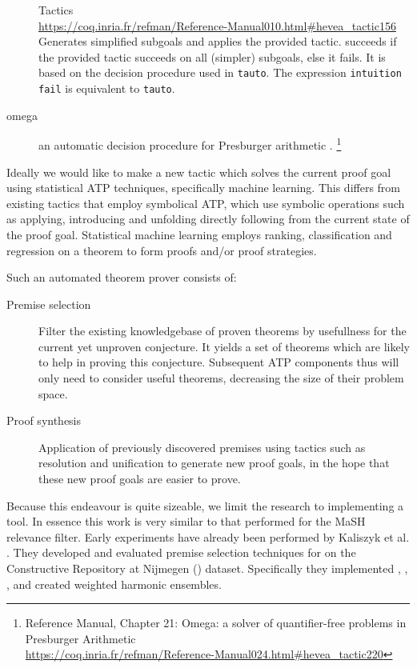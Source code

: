 \begin{description}
{    Tactics\\
    \url{https://coq.inria.fr/refman/Reference-Manual010.html\#hevea_tactic156}
  }
  Generates simplified subgoals and applies the provided tactic.
   succeeds if the provided tactic succeeds on all (simpler) subgoals, else it fails.
  It is based on the decision procedure used in \texttt{tauto}.
  The expression \texttt{intuition fail} is equivalent to \texttt{tauto}.
\item[omega]
  an automatic decision procedure for Presburger arithmetic \cite{stansifer1984presburger}.%
  \footnote{
    \coq Reference Manual, Chapter 21:
    Omega: a solver of quantifier-free problems in Presburger Arithmetic\\
    \url{https://coq.inria.fr/refman/Reference-Manual024.html\#hevea_tactic220}
  }
\end{description}

Ideally we would like to make a new tactic which solves the current proof goal using statistical ATP techniques, specifically machine learning.
This differs from existing tactics that employ symbolical ATP,
which use symbolic operations such as applying, introducing and unfolding
directly following from the current state of the proof goal.
Statistical machine learning employs ranking, classification and regression on a theorem to form proofs and/or proof strategies.

Such an automated theorem prover consists of:
\begin{description}
\item[Premise selection] Filter the existing knowledgebase of proven theorems by usefullness for the current yet unproven conjecture.
It yields a set of theorems which are likely to help in proving this conjecture.
Subsequent ATP components thus will only need to consider useful theorems, decreasing the size of their problem space.
\item[Proof synthesis] Application of previously discovered premises using tactics
such as resolution and unification \cite{dowek1993complete} to generate new proof goals,
in the hope that these new proof goals are easier to prove.
\end{description}

Because this endeavour is quite sizeable, we limit the research to implementing a \premiseselection tool.
In essence this work is very similar to that performed for the MaSH relevance filter.
Early experiments have already been performed by Kaliszyk et al. \cite{kaliszyk2014machine}.
They developed and evaluated premise selection techniques for \coq on the Constructive \coq Repository at Nijmegen (\corn) dataset.
Specifically they implemented \knn, \nb, \mepo, and created weighted harmonic ensembles.

